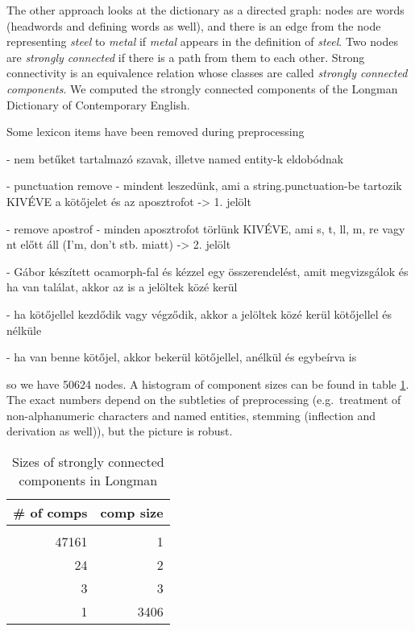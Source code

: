 \documentclass[a4paper,10pt]{article}
\begin{document}
The other approach looks at the dictionary as a directed graph: nodes are
words (headwords and defining words as well), and there is an edge from the
node representing \emph{steel} to \emph{metal} if \emph{metal} appears in the
definition of \emph{steel}. Two nodes are \emph{strongly connected} if there
is a path from them to each other. Strong connectivity is an equivalence
relation whose classes are called \emph{strongly connected components}. We
computed the strongly connected components of the Longman Dictionary of
Contemporary English. 

Some lexicon items have been removed during preprocessing 
{\color{red}
- nem betűket tartalmazó szavak, illetve named entity-k eldobódnak

- punctuation remove - mindent leszedünk, ami a string.punctuation-be tartozik
KIVÉVE a kötőjelet és az aposztrofot -> 1. jelölt

- remove apostrof - minden aposztrofot törlünk KIVÉVE, ami s, t, ll, m, re
vagy nt előtt áll (I'm, don't stb. miatt) -> 2. jelölt

- Gábor készített ocamorph-fal és kézzel egy összerendelést, amit megvizsgálok
és ha van találat, akkor az is a jelöltek közé kerül

- ha kötőjellel kezdődik vagy végződik, akkor a jelöltek közé kerül kötőjellel
és nélküle

- ha van benne kötőjel, akkor bekerül kötőjellel, anélkül és egybeírva is
}

so we have 50624
nodes. A histogram of component sizes can be found in table
\ref{table_compon}. The exact numbers depend on the subtleties of
preprocessing (e.g.\ treatment of non-alphanumeric characters and named
entities, stemming (inflection and derivation as well)), but the picture is
robust.


\begin{table}
 \begin{center}
  \begin{tabular}{rr}
   \toprule
   \# of comps & comp size
   \\\midrule
   \\  47161	& 1
   \\  24	& 2
   \\  3	& 3
   \\  1        & 3406
   \\ \bottomrule
  \end{tabular}
  \caption{Sizes of strongly connected components in Longman}
  \label{table_compon}
 \end{center}
\end{table}
\end{document}
